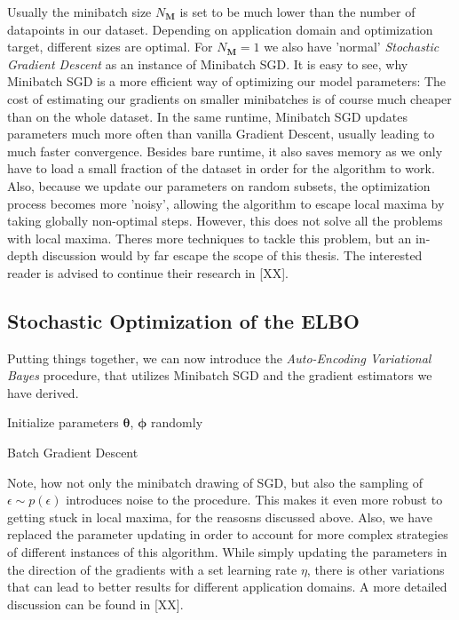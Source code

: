 \documentclass[12pt]{report}
\theoremstyle{definition}
\begin{document}
Usually the minibatch size $N_{\mathbf{M}}$ is set to be much lower than the number of datapoints in our dataset. Depending on application domain and optimization target, different sizes are optimal. For $N_\mathbf{M}=1$ we also have 'normal' \emph{Stochastic Gradient Descent} as an instance of Minibatch SGD. It is easy to see, why Minibatch SGD is a more efficient way of optimizing our model parameters: The cost of estimating our gradients on smaller minibatches is of course much cheaper than on the whole dataset. In the same runtime, Minibatch SGD updates parameters much more often than vanilla Gradient Descent, usually leading to much faster convergence. Besides bare runtime, it also saves memory as we only have to load a small fraction of the dataset in order for the algorithm to work. Also, because we update our parameters on random subsets, the optimization process becomes more 'noisy', allowing the algorithm to escape local maxima by taking globally non-optimal steps. However, this does not solve all the problems with local maxima. Theres more techniques to tackle this problem, but an in-depth discussion would by far escape the scope of this thesis. The interested reader is advised to continue their research in [XX].



\subsection{Stochastic Optimization of the ELBO}
Putting things together, we can now introduce the \emph{Auto-Encoding Variational Bayes} procedure, that utilizes Minibatch SGD and the gradient estimators we have derived. \\
\begin{algorithm}[H]
\SetAlgoLined
Initialize parameters $\pmb{\theta}$, $\pmb{\phi}$ randomly\\
\caption{Batch Gradient Descent}
\end{algorithm} 
Note, how not only the minibatch drawing of SGD, but also the sampling of $\epsilon \sim p(\epsilon)$ introduces noise to the procedure. This makes it even more robust to getting stuck in local maxima, for the reasosns discussed above. Also, we have replaced the parameter updating in order to account for more complex strategies of different instances of this algorithm. While simply updating the parameters in the direction of the gradients with a set learning rate $\eta$, there is other variations that can lead to better results for different application domains. A more detailed discussion can be found in [XX].
\end{document}
